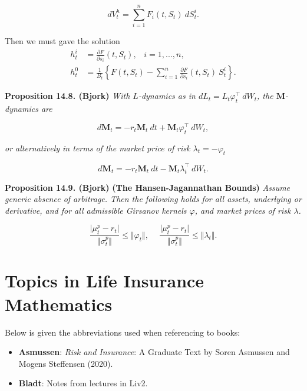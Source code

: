 \documentclass[a4paper,10pt,openany]{book}
\providecommand{\tightlist}{%
 \setlength{\itemsep}{0pt}\setlength{\parskip}{0pt}}
\begin{document}
\[
dV_t^h=\sum_{i=1}^n F_i(t,S_t)\ dS_t^i.
\]

Then we must gave the solution
\begin{align*}
h_t^i&=\frac{\partial F}{\partial s_i}(t,S_t),\hspace{10pt}i=1,...,n,\tag{14.32}\\
h_t^0&=\frac{1}{B_t}\left\{F(t,S_t)-\sum_{i=1}^n \frac{\partial F}{\partial s_i}(t,S_t)\ S_t^i\right\}.\tag{14.33}
\end{align*}

\textbf{Proposition 14.8. (Bjork)} \emph{With \(L\)-dynamics as in \(dL_t=L_t\varphi^\top_t\ dW_t\), the \(\mathbf{M}\)-dynamics are}

\[
d\mathbf{M}_t=-r_t\mathbf{M}_t\ dt+\mathbf{M}_t\varphi_t^\top\ dW_t,\tag{14.39}
\]

\emph{or alternatively in terms of the market price of risk \(\lambda_t=-\varphi_t\)}

\[
d\mathbf{M}_t=-r_t\mathbf{M}_t\ dt-\mathbf{M}_t\lambda_t^\top\ dW_t.\tag{14.40}
\]

\textbf{Proposition 14.9. (Bjork)} \textbf{(The Hansen-Jagannathan Bounds)} \emph{Assume generic absence of arbitrage. Then the following holds for all assets, underlying or derivative, and for all admissible Girsanov kernels \(\varphi\), and market prices of risk \(\lambda\).}

\[
\frac{\vert \mu_t^p - r_t\vert}{\Vert \sigma_t ^p\Vert}\le \Vert \varphi_t\Vert,\hspace{15pt} \frac{\vert \mu_t^p - r_t\vert}{\Vert \sigma_t ^p\Vert}\le \Vert \lambda_t\Vert.\tag{14.42}
\]

\hypertarget{topics-in-life-insurance-mathematics}{%
\chapter{Topics in Life Insurance Mathematics}\label{topics-in-life-insurance-mathematics}}

Below is given the abbreviations used when referencing to books:

\begin{itemize}
\tightlist
\item
  \textbf{Asmussen}: \emph{Risk and Insurance}: A Graduate Text by Soren Asmussen and Mogens Steffensen (2020).\cite{asmussen2020}
\item
  \textbf{Bladt}: Notes from lectures in Liv2.
\end{itemize}
\end{document}
